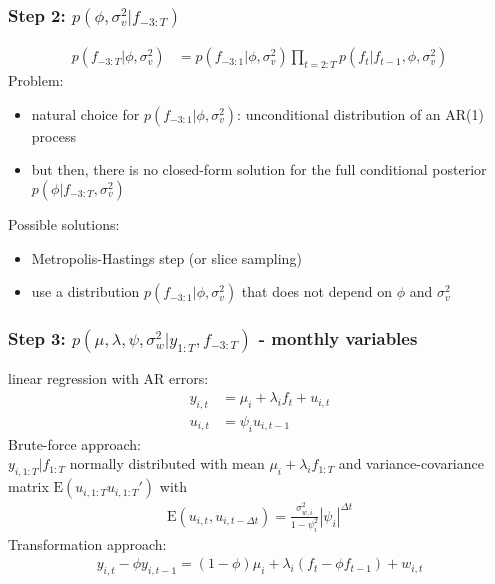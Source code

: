 \documentclass{beamer}
\begin{document}
\begin{frame}
\frametitle{Step 2: $p(\phi, \sigma_{v}^2|f_{-3:T})$}
\begin{align}
p(f_{-3:T}|\phi, \sigma_{v}^2) &= p(f_{-3:1}|\phi, \sigma_{v}^2)\prod_{t=2:T} p(f_t|f_{t-1}, \phi, \sigma_{v}^2)
\end{align}
Problem:
\begin{itemize}
	\item natural choice for $p(f_{-3:1}|\phi, \sigma_{v}^2)$: unconditional distribution of an AR(1) process
	\item but then, there is no closed-form solution for the full conditional posterior $p(\phi |f_{-3:T}, \sigma_{v}^2)$
\end{itemize}
Possible solutions:
\begin{itemize}
	\item Metropolis-Hastings step (or slice sampling)
	\item use a distribution $p(f_{-3:1}|\phi, \sigma_{v}^2)$ that does not depend on $\phi$ and $\sigma_v^2$
\end{itemize}
\end{frame}

\begin{frame}
\frametitle{Step 3: $p(\mu, \lambda, \psi, \sigma_{w}^2|y_{1:T}, f_{-3:T})$ - monthly variables}
linear regression with AR errors:\\
\begin{align}
y_{i,t} &= \mu_i + \lambda_i f_t + u_{i,t} \\
u_{i,t} &= \psi_i u_{i,t-1}
\end{align}
Brute-force approach:\\
$y_{i,1:T}|f_{1:T}$ normally distributed with mean $\mu_i + \lambda_i f_{1:T}$ and variance-covariance matrix $\mathrm{E}(u_{i,1:T} u_{i,1:T}')$ with
\begin{align}
\mathrm{E}(u_{i,t}, u_{i,t-\Delta t}) = \frac{\sigma_{w,i}^2}{1-\psi_i^2} |\psi_i|^{\Delta t}
\end{align}
Transformation approach:
\begin{align}
y_{i,t}-\phi y_{i,t-1} = (1-\phi)\mu_i + \lambda_i (f_t - \phi f_{t-1}) + w_{i,t}
\end{align}
\end{frame}
\end{document}
